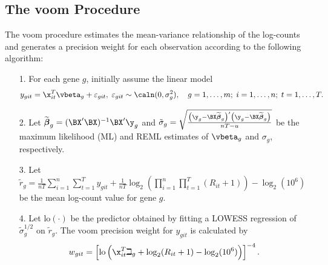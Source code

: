 \subsection{The voom Procedure}
The voom procedure \citep{law2014} estimates the mean-variance relationship of the log-counts and generates a precision weight for each observation according to the following algorithm:
\begin{enumerate}
  \item[1.] For each gene $g$, initially assume the linear model
  \[
  y_{git} = \x_{it}^T\vbeta_g + \varepsilon_{git}, \; \varepsilon_{git} \sim \caln(0, \sigma^2_g), \quad g = 1, \dots, m;\; i = 1, \dots, n;\; t = 1, \dots, T .
  \]
  \item[2.] Let $\widetilde{\boldsymbol{\beta}}_g = (\BX'\BX)^{-1}\BX'\y_g$ and $\tilde{\sigma}_g = \sqrt{\frac{\left(\y_g - \BX\widetilde{\boldsymbol{\beta}}_g\right)'\left(\y_g - \BX\widetilde{\boldsymbol{\beta}}_g\right)}{nT - u}}$ be the maximum likelihood (ML) and REML estimates  of $\vbeta_g$ and  $\sigma_g$, respectively.
  \item[3.] Let $\tilde{r}_g = \frac{1}{nT}\sum_{i = 1}^n\sum_{t = 1}^T y_{git} +\frac{1}{nT}\log_2 \left(\prod_{i = 1}^n\prod_{t = 1}^T (R_{it}+1)\right) - \log_2(10^6)$ be the mean log-count value for gene $g$.
\item[4.] Let $\mbox{lo}(\cdot)$ be the predictor obtained by fitting a LOWESS regression \citep{cleveland1979} of $\tilde{\sigma}_g^{1/2}$ on $\tilde{r}_g$. The voom precision weight for $y_{git}$ is calculated by
\[
w_{git} = \left[\mbox{lo}\left( \x_{it}^T\beth_g + \log_2(R_{it}+1) - \log_2(10^6)  \right)\right]^{-4}.
\]
\end{enumerate}
